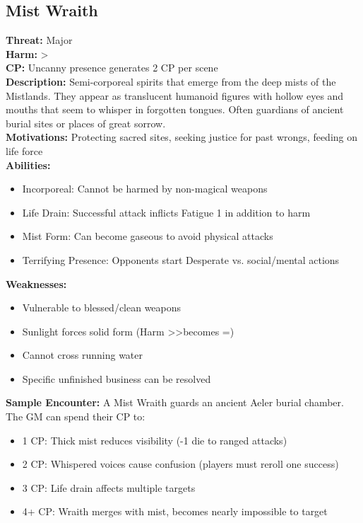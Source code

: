 \documentclass[11pt]{article}
\newenvironment{monsterentry}[1]{%
  \begin{mdframed}[backgroundcolor=shadecolor, linewidth=0pt, leftmargin=0pt, rightmargin=0pt]%
  \subsection*{#1}%
}{%
  \end{mdframed}%
}
\begin{document}
\begin{monsterentry}{Mist Wraith}
\textbf{Threat:} Major \\
\textbf{Harm:} \textgreater \\
\textbf{CP:} Uncanny presence generates 2 CP per scene \\
\textbf{Description:} Semi-corporeal spirits that emerge from the deep mists of the Mistlands. They appear as translucent humanoid figures with hollow eyes and mouths that seem to whisper in forgotten tongues. Often guardians of ancient burial sites or places of great sorrow. \\
\textbf{Motivations:} Protecting sacred sites, seeking justice for past wrongs, feeding on life force \\
\textbf{Abilities:}
\begin{itemize}
    \item Incorporeal: Cannot be harmed by non-magical weapons
    \item Life Drain: Successful attack inflicts Fatigue 1 in addition to harm
    \item Mist Form: Can become gaseous to avoid physical attacks
    \item Terrifying Presence: Opponents start Desperate vs. social/mental actions
\end{itemize}
\textbf{Weaknesses:}
\begin{itemize}
    \item Vulnerable to blessed/clean weapons
    \item Sunlight forces solid form (Harm \textgreater\textgreater becomes =)
    \item Cannot cross running water
    \item Specific unfinished business can be resolved
\end{itemize}
\textbf{Sample Encounter:} A Mist Wraith guards an ancient Aeler burial chamber. The GM can spend their CP to:
\begin{itemize}
    \item 1 CP: Thick mist reduces visibility (-1 die to ranged attacks)
    \item 2 CP: Whispered voices cause confusion (players must reroll one success)
    \item 3 CP: Life drain affects multiple targets
    \item 4+ CP: Wraith merges with mist, becomes nearly impossible to target
\end{itemize}
\end{monsterentry}
\end{document}
